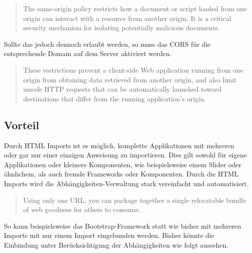 \begin{quote}
The same-origin policy restricts how a document or script loaded from one origin can interact with a resource from another origin. It is a critical security mechanism for isolating potentially malicious documents. \cite{citeulike:13853253}
\end{quote}

Sollte das jedoch dennoch erlaubt werden, so muss das CORS für die entsprechende Domain auf dem Server aktiviert werden.

\begin{quote}
These restrictions prevent a client-side Web application running from one origin from obtaining data retrieved from another origin, and also limit unsafe HTTP requests that can be automatically launched toward destinations that differ from the running application's origin. \cite{citeulike:13853643}
\end{quote}


\subsection{Vorteil}\label{vorteil}

Durch HTML Imports ist es möglich, komplette Applikationen mit mehreren oder gar nur einer einzigen Anweisung zu importieren. Dies gilt sowohl für eigene Applikationen oder kleinere Komponenten, wie beispielsweise einem Slider oder ähnlichem, als auch fremde Frameworks oder Komponenten. Durch die HTML Imports wird die Abhängigkeiten-Verwaltung stark vereinfacht und automatisiert.

\begin{quote}
Using only one URL, you can package together a single relocatable bundle of web goodness for others to consume. \cite{citeulike:13853647}
\end{quote}

So kann beispielsweise das Bootstrap-Framework statt wie bisher mit mehreren Imports mit nur einem Import eingebunden werden. Bisher könnte die Einbindung unter Berücksichtigung der Abhängigkeiten wie folgt aussehen.

\begin{Shaded}
\begin{Highlighting}[]
\KeywordTok{>}
\KeywordTok{>}
\end{Highlighting}
\end{Shaded}

